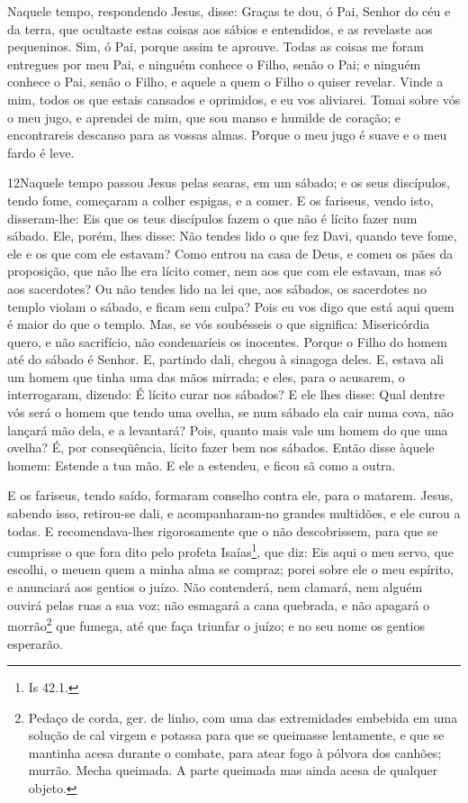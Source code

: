 Naquele tempo, respondendo Jesus, disse: Graças te dou, ó Pai,
Senhor do céu e da terra, que ocultaste estas coisas aos sábios e
entendidos, e as revelaste aos pequeninos. Sim, ó Pai, porque
assim te aprouve. Todas as coisas me foram entregues por meu
Pai, e ninguém conhece o Filho, senão o Pai; e ninguém conhece o
Pai, senão o Filho, e aquele a quem o Filho o quiser revelar.
Vinde a mim, todos os que estais cansados e oprimidos, e eu
vos aliviarei. Tomai sobre vós o meu jugo, e aprendei de mim,
que sou manso e humilde de coração; e encontrareis descanso para as
vossas almas. Porque o meu jugo é suave e o meu fardo é leve.

\medskip

\lettrine{12} Naquele tempo passou Jesus pelas searas, em um
sábado; e os seus discípulos, tendo fome, começaram a colher
espigas, e a comer. E os fariseus, vendo isto, disseram-lhe: Eis
que os teus discípulos fazem o que não é lícito fazer num sábado.
Ele, porém, lhes disse: Não tendes lido o que fez Davi, quando
teve fome, ele e os que com ele estavam? Como entrou na casa de
Deus, e comeu os pães da proposição, que não lhe era lícito comer,
nem aos que com ele estavam, mas só aos sacerdotes? Ou não
tendes lido na lei que, aos sábados, os sacerdotes no templo violam
o sábado, e ficam sem culpa? Pois eu vos digo que está aqui quem
é maior do que o templo. Mas, se vós soubésseis o que significa:
Misericórdia quero, e não sacrifício, não condenaríeis os inocentes.
Porque o Filho do homem até do sábado é Senhor. E, partindo
dali, chegou à sinagoga deles. E, estava ali um homem que
tinha uma das mãos mirrada; e eles, para o acusarem, o interrogaram,
dizendo: É lícito curar nos sábados? E ele lhes disse: Qual
dentre vós será o homem que tendo uma ovelha, se num sábado ela cair
numa cova, não lançará mão dela, e a levantará? Pois, quanto
mais vale um homem do que uma ovelha? É, por conseqüência, lícito
fazer bem nos sábados. Então disse àquele homem: Estende a
tua mão. E ele a estendeu, e ficou sã como a outra.

E os fariseus, tendo saído, formaram conselho contra ele, para o
matarem. Jesus, sabendo isso, retirou-se dali, e
a\-com\-pa\-nha\-ram-no grandes multidões, e ele curou a todas. E
recomendava-lhes rigorosamente que o não descobrissem, para
que se cumprisse o que fora dito pelo profeta Isaías\footnote{Is
42.1.}, que diz: Eis aqui o meu servo, que escolhi, o meuem quem a minha alma se compraz; porei sobre ele o meu
espírito, e anunciará aos gentios o juízo. Não contenderá,
nem clamará, nem alguém ouvirá pelas ruas a sua voz; não
esmagará a cana quebrada, e não apagará o morrão\footnote{Pedaço de
corda, ger. de linho, com uma das extremidades embebida em uma
solução de cal virgem e potassa para que se queimasse lentamente, e
que se mantinha acesa durante o combate, para atear fogo à pólvora
dos canhões; murrão. Mecha queimada. A parte queimada mas ainda
acesa de qualquer objeto.} que fumega, até que faça triunfar o
juízo; e no seu nome os gentios esperarão.

